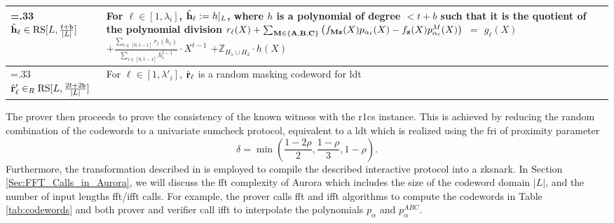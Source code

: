 \begin{table}[]
{\begin{tabularx}{\linewidth}{>{\hsize=.33\hsize}XX}
$\hat{{\bf{h}}}_\ell \in  \text{RS}[L, \frac{t+\texttt{b}}{|L|}]$ & For $\ell\in [1,\lambda_i]$,  $\hat{{\bf{h}}}_\ell := h|_L$, where $h$ is a polynomial of degree $<t+b$ such that it is the quotient of the polynomial division \newline
\(
r_\ell(X) + \sum_{\mathbf{M} \in \{\mathbf{A}, \mathbf{B}, \mathbf{C}\}} \left(f_{\mathbf{Mz}}(X)p_{\alpha_\ell}(X) - f_{\bf{z}}(X) p^{M}_{\alpha_\ell}(X)\right)
\) $=$ $g_\ell(X)$
$ + \frac{\sum_{i\in[0,t-1]}r_\ell(h_i)}{\sum_{i\in[0,t-1]}h_i^{t-1}}\cdot X^{t-1} $
$+ \mathbb{Z}_{H_1\cup H_2} \cdot h(X)$
\\
\midrule
$\hat{{\bf{r}}}'_\ell \in_R  \text{RS}[L, \frac{2t+2\texttt{b}}{|L|}]$ & For $\ell\in [1,\lambda'_i]$, $\hat{{\bf{r}}}_\ell$ is a random masking codeword for \gls{ldt}
\\
\bottomrule
\end{tabularx}
}
\end{table}
The prover then proceeds to prove the consistency of the known witness with the \gls{r1cs} instance. This is achieved by reducing the random combination of the codewords to a univariate sumcheck protocol, equivalent to a \gls{ldt} which is realized using the \gls{fri} of proximity parameter 
\begin{equation}\label{eq:proximity_parameter}
\delta = \min\left( \frac{1-2\rho}{2}, \frac{1-\rho}{3}, 1-\rho \right).
\end{equation}
Furthermore, the transformation described in \cite{Ben-Sasson2016IOP} is employed to compile the described interactive protocol into a \gls{zksnark}. In Section \ref{Sec:FFT_Calls_in_Aurora}, we will discuss the \gls{fft} complexity of Aurora which includes the size of the codeword domain $|L|$, and the number of input lengths \gls{fft}/\gls{ifft} calls. For example, the prover calls \gls{fft} and \gls{ifft} algorithms to compute the codewords in Table \ref{tab:codewords} and both prover and verifier call  \gls{ifft}  to interpolate the polynomials $p_\alpha$ and $p^{ABC}_\alpha$. 




